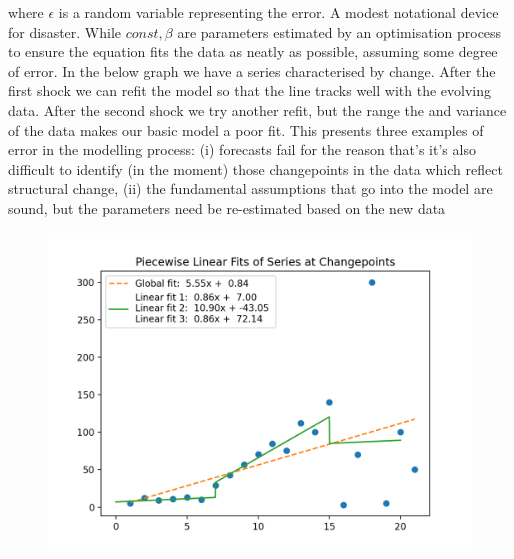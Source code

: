 \documentclass[10pt,a4paper,notitlepage, twocolumn]{article}
\begin{document}
\noindent where $\epsilon$ is a random variable representing the error. A modest notational device for disaster. While $const, \beta$ are parameters estimated by an optimisation process to ensure the equation fits the data as neatly as possible, assuming some degree of error. In the below graph we have a series characterised by change. After the first shock we can refit the model so that the line tracks well with the evolving data. After the second shock we try another refit, but the range the and variance of the data makes our basic model a poor fit. This presents three examples of error in the modelling process: (i) forecasts fail for the reason that's it's also difficult to identify (in the moment) those changepoints in the data which reflect structural change, (ii)  the fundamental assumptions that go into the model are sound, but the parameters need be re-estimated based on the new data
\begin{figure}[H]
  \includegraphics[width=\linewidth]{./Plots/piecewise_linear_fits.png}
\end{figure}
\end{document}
